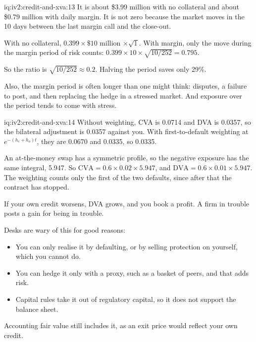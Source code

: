\begin{solution}{iq:iv2:credit-and-xva:13}
It is about \$3.99 million with no collateral and about \$0.79 million with daily margin. It is not zero because the market moves in the 10 days between the last margin call and the close-out.

With no collateral, $0.399 \times \$10$ million $\times \sqrt{1}$. With margin, only the move during the margin period of risk counts: $0.399 \times 10 \times \sqrt{10/252} = 0.795$.

So the ratio is $\sqrt{10/252} \approx 0.2$. Halving the period saves only 29\%.

Also, the margin period is often longer than one might think: disputes, a failure to post, and then replacing the hedge in a stressed market. And exposure over the period tends to come with stress.

\end{solution}

\begin{solution}{iq:iv2:credit-and-xva:14}
Without weighting, CVA is 0.0714 and DVA is 0.0357, so the bilateral adjustment is 0.0357 against you. With first-to-default weighting at $e^{-(h_c + h_o)t}$, they are 0.0670 and 0.0335, so 0.0335.

An at-the-money swap has a symmetric profile, so the negative exposure has the same integral, 5.947. So $\mathrm{CVA} = 0.6 \times 0.02 \times 5.947$, and $\mathrm{DVA} = 0.6 \times 0.01 \times 5.947$. The weighting counts only the first of the two defaults, since after that the contract has stopped.

If your own credit worsens, DVA grows, and you book a profit. A firm in trouble posts a gain for being in trouble.

Desks are wary of this for good reasons:
\begin{itemize}
\item You can only realise it by defaulting, or by selling protection on yourself, which you cannot do.
\item You can hedge it only with a proxy, such as a basket of peers, and that adds risk.
\item Capital rules take it out of regulatory capital, so it does not support the balance sheet.
\end{itemize}

Accounting fair value still includes it, as an exit price would reflect your own credit.

\end{solution}

